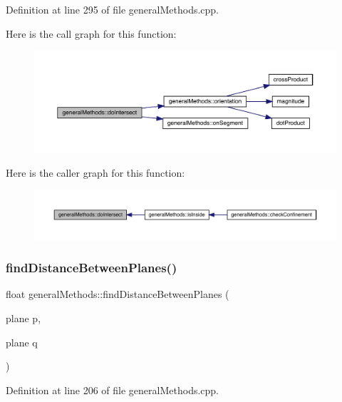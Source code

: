 Definition at line 295 of file general\+Methods.\+cpp.

Here is the call graph for this function\+:
\nopagebreak
\begin{figure}[H]
\begin{center}
\leavevmode
\includegraphics[width=350pt]{namespacegeneral_methods_a56efd049c58aae30a7b0caf39beab615_cgraph}
\end{center}
\end{figure}
Here is the caller graph for this function\+:
\nopagebreak
\begin{figure}[H]
\begin{center}
\leavevmode
\includegraphics[width=350pt]{namespacegeneral_methods_a56efd049c58aae30a7b0caf39beab615_icgraph}
\end{center}
\end{figure}
\mbox{\label{namespacegeneral_methods_a3bc88a001e751ad419e87bf3795ca02b}} 
\subsubsection{\texorpdfstring{find\+Distance\+Between\+Planes()}{findDistanceBetweenPlanes()}}
{\footnotesize\ttfamily float general\+Methods\+::find\+Distance\+Between\+Planes (\begin{DoxyParamCaption}\item[{plane}]{p,  }\item[{plane}]{q }\end{DoxyParamCaption})}



Definition at line 206 of file general\+Methods.\+cpp.

